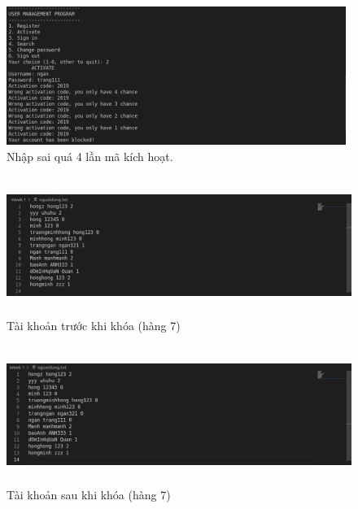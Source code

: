 \documentclass[12pt]{article}
\begin{document}
\begin{figure}[h]
    \begin{center}
        \includegraphics[width=0.8\linewidth, height=4.5cm]{Img/Thu4Lan.png}
    \end{center}
    \caption{Nhập sai quá 4 lần mã kích hoạt.}
    \label{fig:2_nhapsai}
\end{figure}
\begin{figure}[h]
    \begin{center}
        \includegraphics[width=0.8\linewidth, height=4.5cm]{Img/Truockhikhoa.png}
    \end{center}
    \caption{Tài khoản trước khi khóa (hàng 7)}
    \label{fig:2_truoc}
\end{figure}

\begin{figure}[h]
    \begin{center}
        \includegraphics[width=0.8\linewidth, height=4.5cm]{Img/Saukhikhoa.png}
    \end{center}
    \caption{Tài khoản sau khi khóa (hàng 7)}
    \label{fig:2_sau}
\end{figure}
\end{document}
